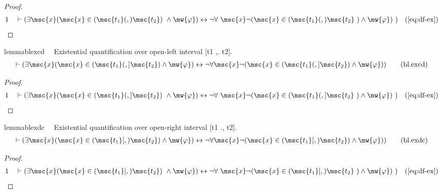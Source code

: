 \begin{proof}
\begin{align}
  1 &&  & \vdash ( \exists \msc{x} ( \msc{x} \in ( \msc{t_1} (,) \msc{t_2} )
     ~\wedge \mw{\varphi} ) \leftrightarrow \lnot \forall
     ~\msc{x} \lnot ( \msc{x} \in ( \msc{t_1} (,) \msc{t_2}
     ~) \wedge \mw{\varphi} )
     ~)&(\mbox{\ref{eq:df-ex}})\notag
\end{align}
\end{proof}

\begin{restatable}{lemma}{blexcd}~~ Existential quantification over open-left
interval [t1 ,. t2].
\begin{align}
\vdash ( \exists \msc{x} ( \msc{x} \in ( \msc{t_1} (,] \msc{t_2} ) \wedge
    \mw{\varphi} ) \leftrightarrow \lnot \forall \msc{x} \lnot ( \msc{x} \in (
    \msc{t_1} (,] \msc{t_2} ) \wedge \mw{\varphi} )
    )\label{eq:bl.excd}\tag{bl.excd}
\end{align}
\end{restatable}

\begin{proof}
\begin{align}
  1 &&  & \vdash ( \exists \msc{x} ( \msc{x} \in ( \msc{t_1} (,] \msc{t_2} )
     ~\wedge \mw{\varphi} ) \leftrightarrow \lnot \forall
     ~\msc{x} \lnot ( \msc{x} \in ( \msc{t_1} (,] \msc{t_2}
     ~) \wedge \mw{\varphi} )
     ~)&(\mbox{\ref{eq:df-ex}})\notag
\end{align}
\end{proof}

\begin{restatable}{lemma}{blexdc}~~ Existential quantification over open-right
interval [t1 ., t2].
\begin{align}
\vdash ( \exists \msc{x} ( \msc{x} \in ( \msc{t_1} [,) \msc{t_2} ) \wedge
    \mw{\varphi} ) \leftrightarrow \lnot \forall \msc{x} \lnot ( \msc{x} \in (
    \msc{t_1} [,) \msc{t_2} ) \wedge \mw{\varphi} )
    )\label{eq:bl.exdc}\tag{bl.exdc}
\end{align}
\end{restatable}

\begin{proof}
\begin{align}
  1 &&  & \vdash ( \exists \msc{x} ( \msc{x} \in ( \msc{t_1} [,) \msc{t_2} )
     ~\wedge \mw{\varphi} ) \leftrightarrow \lnot \forall
     ~\msc{x} \lnot ( \msc{x} \in ( \msc{t_1} [,) \msc{t_2}
     ~) \wedge \mw{\varphi} )
     ~)&(\mbox{\ref{eq:df-ex}})\notag
\end{align}
\end{proof}

